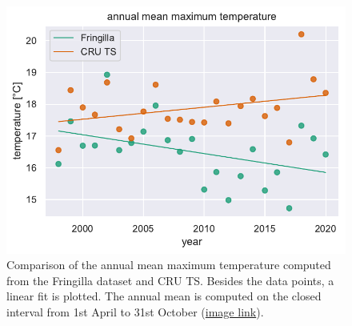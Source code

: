 \begin{figure}[H]
	\centering
	\includegraphics[width=0.9\linewidth]{figs/annual-mean-tmp-comparison}
	\caption{Comparison of the annual mean maximum temperature computed from the Fringilla dataset and CRU TS. Besides the data points, a linear fit is plotted. The annual mean is computed on the closed interval from 1st April to 31st October (\href{https://github.com/gtlab-barcelona/Robert/blob/main/data-exploration_first-last/figs/first-last-day_1998-2020/annual-mean-tmp-comparison.pdf}{image link}).}
	\label{fig:annual-mean-tmp}
\end{figure}

